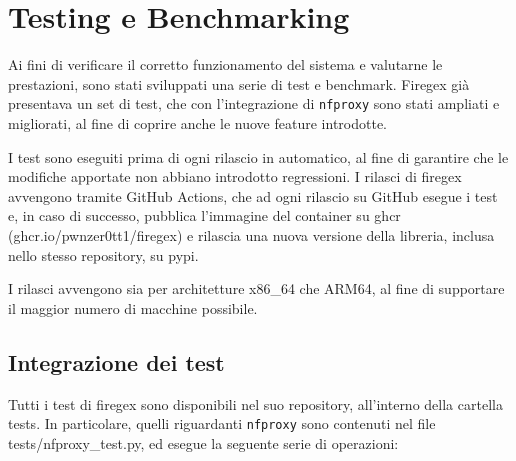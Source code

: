\chapter{Testing e Benchmarking}\label{chap:tests}

Ai fini di verificare il corretto funzionamento del sistema e valutarne le prestazioni, sono stati sviluppati una serie di test e benchmark. Firegex già presentava un set di test, che con l'integrazione di \texttt{\gls{nfproxy}} sono stati ampliati e migliorati, al fine di coprire anche le nuove feature introdotte.

I test sono eseguiti prima di ogni rilascio in automatico, al fine di garantire che le modifiche apportate non abbiano introdotto regressioni. I rilasci di firegex avvengono tramite GitHub Actions, che ad ogni rilascio su GitHub esegue i test e, in caso di successo, pubblica l'immagine del container su \gls{ghcr} (ghcr.io/pwnzer0tt1/firegex) e rilascia una nuova versione della libreria, inclusa nello stesso repository, su \gls{pypi}.

I rilasci avvengono sia per architetture x86\_64 che ARM64, al fine di supportare il maggior numero di macchine possibile.

\section{Integrazione dei test}

Tutti i test di firegex sono disponibili nel suo repository, all'interno della cartella tests. In particolare, quelli riguardanti \texttt{\gls{nfproxy}} sono contenuti nel file tests/nfproxy\_test.py, ed esegue la seguente serie di operazioni:

